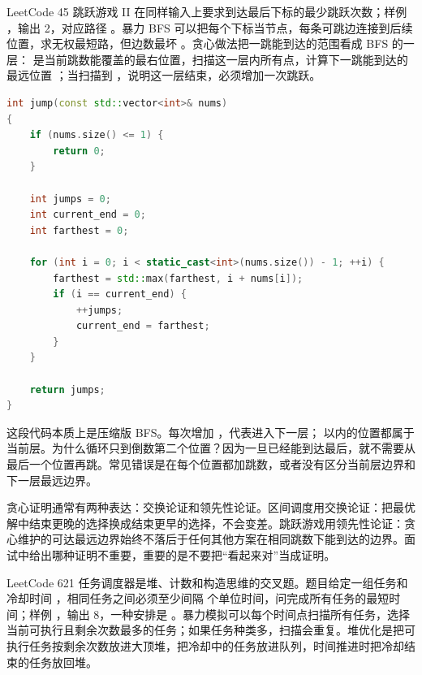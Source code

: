 LeetCode 45 跳跃游戏 II 在同样输入上要求到达最后下标的最少跳跃次数；样例 ，输出 2，对应路径 。暴力 BFS 可以把每个下标当节点，每条可跳边连接到后续位置，求无权最短路，但边数最坏 。贪心做法把一跳能到达的范围看成 BFS 的一层： 是当前跳数能覆盖的最右位置，扫描这一层内所有点，计算下一跳能到达的最远位置 ；当扫描到 ，说明这一层结束，必须增加一次跳跃。

\begin{lstlisting}[language=C++,caption={LeetCode 45 跳跃游戏 II：按层扩展可达区间}]
int jump(const std::vector<int>& nums)
{
    if (nums.size() <= 1) {
        return 0;
    }

    int jumps = 0;
    int current_end = 0;
    int farthest = 0;

    for (int i = 0; i < static_cast<int>(nums.size()) - 1; ++i) {
        farthest = std::max(farthest, i + nums[i]);
        if (i == current_end) {
            ++jumps;
            current_end = farthest;
        }
    }

    return jumps;
}
\end{lstlisting}

这段代码本质上是压缩版 BFS。每次增加 ，代表进入下一层； 以内的位置都属于当前层。为什么循环只到倒数第二个位置？因为一旦已经能到达最后，就不需要从最后一个位置再跳。常见错误是在每个位置都加跳数，或者没有区分当前层边界和下一层最远边界。

贪心证明通常有两种表达：交换论证和领先性论证。区间调度用交换论证：把最优解中结束更晚的选择换成结束更早的选择，不会变差。跳跃游戏用领先性论证：贪心维护的可达最远边界始终不落后于任何其他方案在相同跳数下能到达的边界。面试中给出哪种证明不重要，重要的是不要把“看起来对”当成证明。

LeetCode 621 任务调度器是堆、计数和构造思维的交叉题。题目给定一组任务和冷却时间 ，相同任务之间必须至少间隔  个单位时间，问完成所有任务的最短时间；样例 ，输出 8，一种安排是 。暴力模拟可以每个时间点扫描所有任务，选择当前可执行且剩余次数最多的任务；如果任务种类多，扫描会重复。堆优化是把可执行任务按剩余次数放进大顶堆，把冷却中的任务放进队列，时间推进时把冷却结束的任务放回堆。

